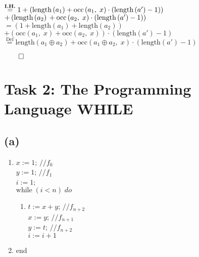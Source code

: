 \documentclass[12pt]{scrartcl}
\begin{document}
\begin{enumerate}
\begin{enumerate}
\begin{enumerate}
\begin{enumerate}
					$\overset{\text{\textbf{I.H.}}}{=}1+\left(\text{length}\left(a_{1}\right)+\text{occ}\left(a_{1},\;x\right)\cdot\left(\text{length}\left(a'\right)-1\right)\right)$\\
					\hspace*{27pt} $+ \left(\text{length}\left(a_{2}\right)\\+\text{occ}\left(a_{2},\;x\right)\cdot\left(\text{length}\left(a'\right)-1\right)\right)$\\[6pt]
					$=\left( 1+\text{length}\left(a_{1}\right)+\text{length}\left(a_{2}\right)\right)$\\
					\hspace*{26pt} $+\left(\text{occ}\left(a_{1},\;x\right)+\text{occ}\left(a_{2},\;x\right)\right)\cdot\left(\text{length}\left(a'\right)-1\right)$\\[6pt]
					$\overset{\text{Def}}{=}\text{length}\left(a_{1}\oplus a_{2}\right)+\text{occ}\left(a_{1}\oplus a_{2},\;x\right)\cdot\left(\text{length}\left(a'\right)-1\right)$ 
					\begin{flushright}
						$\qed$					
					\end{flushright}
				\end{enumerate}
			\end{enumerate}
		\end{enumerate}
	\end{enumerate}
	
	\section*{Task 2: The Programming Language WHILE}
	
	\subsection*{(a)}
	
	\begin{enumerate}
		\item[] $x:=1$; \qquad $//f_{0}$\\
				$y:=1$; \qquad $//f_{1}$\\
				$i:=1$;\\
				$\text{while}\; \left(i<n\right)\; do$
		\begin{enumerate}
			\item[] $t:=x+y$; \qquad $//f_{n+2}$\\
					$x:=y$; \qquad \hspace*{16pt} $//f_{n+1}$\\
					$y:=t$; \qquad \hspace*{18pt} $//f_{n+2}$\\
					$i:=i+1$
		\end{enumerate}
		\item[] $\text{end}$
	\end{enumerate}
	\newpage
	
\end{document}
